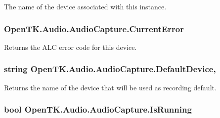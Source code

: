 The name of the device associated with this instance. 

\hypertarget{class_open_t_k_1_1_audio_1_1_audio_capture_aa96bb3494c76ff42f3025955a54a9fa3}{
\subsubsection[{Current\-Error}]{ Open\-T\-K.\-Audio.\-Audio\-Capture.\-Current\-Error\hspace{0.3cm}{\ttfamily [get]}}}\label{class_open_t_k_1_1_audio_1_1_audio_capture_aa96bb3494c76ff42f3025955a54a9fa3}


Returns the A\-L\-C error code for this device.

\hypertarget{class_open_t_k_1_1_audio_1_1_audio_capture_a1d06f49a2c734c2ade40630f54b16d6a}{
\subsubsection[{Default\-Device}]{\setlength{\rightskip}{0pt plus 5cm}string Open\-T\-K.\-Audio.\-Audio\-Capture.\-Default\-Device\hspace{0.3cm}{\ttfamily [static]}, {\ttfamily [get]}}}\label{class_open_t_k_1_1_audio_1_1_audio_capture_a1d06f49a2c734c2ade40630f54b16d6a}


Returns the name of the device that will be used as recording default. 

\hypertarget{class_open_t_k_1_1_audio_1_1_audio_capture_a8a4a985fb46b345289b40b1ee9702770}{
\subsubsection[{Is\-Running}]{\setlength{\rightskip}{0pt plus 5cm}bool Open\-T\-K.\-Audio.\-Audio\-Capture.\-Is\-Running\hspace{0.3cm}{\ttfamily [get]}}}\label{class_open_t_k_1_1_audio_1_1_audio_capture_a8a4a985fb46b345289b40b1ee9702770}


